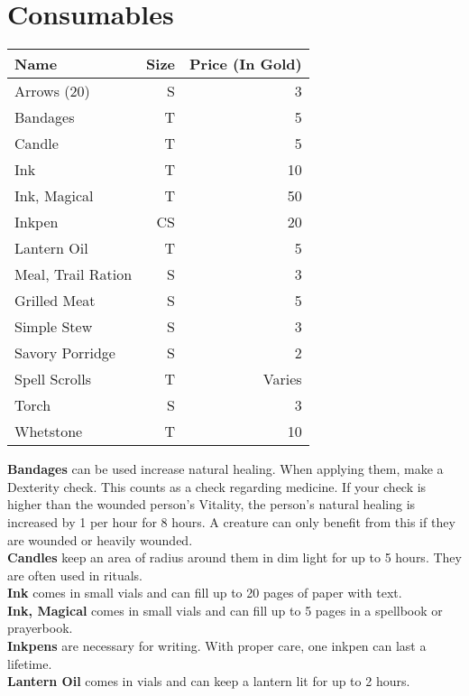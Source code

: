 \section{Consumables}\label{sec:consumables}
\begin{longtable}{l | r | r}
	Name & Size & Price (In Gold)\\ \hline
	Arrows (20) & S & 3\\
	Bandages & T & 5\\
	Candle & T & 5\\
	Ink & T & 10\\
	Ink, Magical & T & 50\\
	Inkpen & CS & 20\\
	Lantern Oil & T & 5\\
	Meal, Trail Ration & S & 3\\
	Grilled Meat & S & 5\\
	Simple Stew & S & 3\\
	Savory Porridge & S & 2\\
	Spell Scrolls & T & Varies\\
	Torch & S & 3\\
	Whetstone & T & 10\\
\end{longtable}


\textbf{Bandages} can be used increase natural healing.
When applying them, make a Dexterity check.
This counts as a check regarding medicine.
If your check is higher than the wounded person's Vitality, the person's natural healing is increased by 1 per hour for 8 hours.
A creature can only benefit from this if they are wounded or heavily wounded.\\

\textbf{Candles} keep an area of  radius around them in dim light for up to 5 hours.
They are often used in rituals.\\

\textbf{Ink} comes in small vials and can fill up to 20 pages of paper with text.\\

\textbf{Ink, Magical} comes in small vials and can fill up to 5 pages in a spellbook or prayerbook.\\

\textbf{Inkpens} are necessary for writing.
With proper care, one inkpen can last a lifetime.\\

\textbf{Lantern Oil} comes in vials and can keep a lantern lit for up to 2 hours.\\


